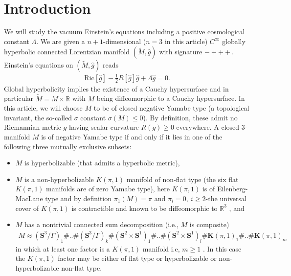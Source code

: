 \documentclass{amsart}
\begin{document}
\section{Introduction}
\noindent We will study the vacuum Einstein's equations including a positive cosmological constant $\Lambda$. We are given a $n+1$-dimensional ($n=3$ in this article) $C^{\infty}$ globally hyperbolic connected  Lorentzian manifold $(\widetilde{M},\widehat{g})$ with signature $-+++$. Einstein's equations on $(\widetilde{M},\widehat{g})$ reads 
\begin{align}
\label{eq:first}
 \text{Ric}[\widehat{g}]-\frac{1}{2}R[\widehat{g}]\widehat{g}+\Lambda \widehat{g}=0.   
\end{align}
Global hyperbolicity implies the existence of a Cauchy hypersurface and in particular $\widetilde{M}= M\times \mathbb{R}$ with $M$ being diffeomorphic to a Cauchy hypersurface. In this article, we will choose $M$ to be of closed negative Yamabe type (a topological invariant, the so-called $\sigma$ constant $\sigma(M)\leq 0$). By definition, these admit no Riemannian
metric $g$ having scalar curvature $R(g)\geq 0$ everywhere. A closed 3-manifold $M$ is of negative Yamabe type if and only if it lies in one of the
following three mutually exclusive subsets:
\begin{itemize}
\item[(1)] $M$ is hyperbolizable (that
admits a hyperbolic metric),
\item[(2)] $M$ is a non-hyperbolizable $K(\pi,1)$ manifold of non-flat type (the six flat $K(\pi,1)$ manifolds are of zero Yamabe type), here $K(\pi,1)$ is of Eilenberg-MacLane type and by definition $\pi_{1}(M)=\pi$ and $\pi_{i}=0,~i\geq 2$-the universal cover of $K(\pi,1)$ is contractible and known to be diffeomorphic to $\mathbb{R}^{3}$ \cite{porti2008geometrization}, and
\item[(3)] $M$ has a nontrivial connected sum decomposition (i.e., $M$ is composite)
\begin{align}
\label{eq:negative}
M\approx (\mathbf{S}^{3}/\Gamma)_{1}\#..\#(\mathbf{S}^{3}/\Gamma)_{k}\#(\mathbf{S}^{2}\times \mathbf{S}^{1})_{1}\#..\#(\mathbf{S}^{2}\times \mathbf{S}^{1})_{l}\#\mathbf{K}(\pi,1)_{1}\#..\#\mathbf{K}(\pi,1)_{m}  
\end{align}
in which at least one factor is a $K(\pi, 1)$ manifold i.e, $m\geq 1$ \cite{schoenyau}. In this case the $K(\pi,1)$
factor may be either of flat type or hyperbolizable or non-hyperbolizable non-flat type. 
\end{itemize}
\end{document}
